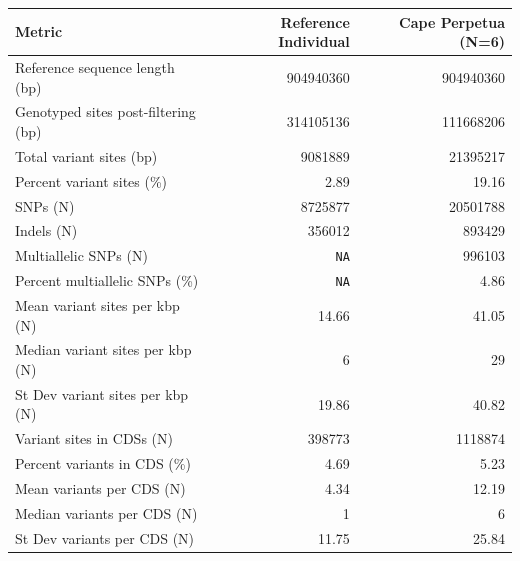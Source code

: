 \begin{table}[ht]
    \centering
    \begin{tabular}{lrr}
        \toprule
        Metric &
            Reference Individual &
            Cape Perpetua (N=6) \\
        \midrule
        Reference sequence length (bp)      & \num{904940360} & \num{904940360} \\
        Genotyped sites post-filtering (bp) & \num{314105136} & \num{111668206} \\
        Total variant sites (bp)            & \num{9081889}   & \num{21395217} \\
        Percent variant sites (\%)          & 2.89            & 19.16 \\
        SNPs (N)                            & \num{8725877}   & \num{20501788} \\
        Indels (N)                          & \num{356012}    & \num{893429} \\
        Multiallelic SNPs (N)               & \texttt{NA}     & \num{996103} \\
        Percent multiallelic SNPs (\%)      & \texttt{NA}     & 4.86 \\
        Mean variant sites per kbp (N)      & 14.66           & 41.05 \\
        Median variant sites per kbp (N)    & 6               & 29 \\
        St Dev variant sites per kbp (N)    & 19.86           & 40.82 \\
        Variant sites in CDSs (N)           & \num{398773}    & \num{1118874} \\
        Percent variants in CDS (\%)        & 4.69            & 5.23 \\
        Mean variants per CDS (N)           & 4.34            & 12.19 \\
        Median variants per CDS (N)         & 1               & 6 \\
        St Dev variants per CDS (N)         & 11.75           & 25.84 \\
        \bottomrule
    \end{tabular}
\label{tab:sup_popgen_stats}
\end{table}

